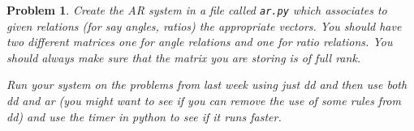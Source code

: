 \documentclass{article}
\newtheorem{problem}{Problem}
\begin{document}
\begin{problem}
    Create the AR system in a file called \verb|ar.py| which associates to given relations (for say angles, ratios) the appropriate vectors. You should have two different matrices one for angle relations and one for ratio relations. You should always make sure that the matrix you are storing is of full rank. 

    Run your system on the problems from last week using just dd and then use both dd and ar (you might want to see if you can remove the use of some rules from dd) and use the timer in python to see if it runs faster. 
\end{problem}
\end{document}
